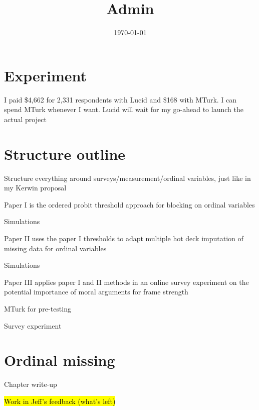 

\title{Admin}

\date{\today}



\maketitle


\section*{Experiment}
	\begin{coi}
		\item I paid \$4,662 for 2,331 respondents with Lucid and \$168 with MTurk. I can spend MTurk whenever I want. Lucid will wait for my go-ahead to launch the actual project
	\end{coi}	
	
\section*{Structure outline}
	\begin{coi}
		\item Structure everything around surveys/measurement/ordinal variables, just like in my Kerwin proposal
		\item Paper I is the ordered probit threshold approach for blocking on ordinal variables
			\begin{coi}
				\item Simulations
			\end{coi}
		\item Paper II uses the paper I thresholds to adapt multiple hot deck imputation of missing data for ordinal variables
			\begin{coi}
				\item Simulations
			\end{coi}
		\item Paper III applies paper I and II methods in an online survey experiment on the potential importance of moral arguments for frame strength
			\begin{coi}
				\item MTurk for pre-testing
				\item Survey experiment
			\end{coi}
	\end{coi}


\section*{Ordinal missing}
	\begin{coi}
		\item Chapter write-up
			\begin{coi}
				\item \hl{Work in Jeff's feedback (what's left)}
			\end{coi}
	\end{coi}
	
